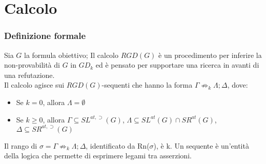 \documentclass[\main/tesi.tex]{subfiles}
\begin{document}
\section{Calcolo}

\subsubsection{Definizione formale}
Sia $G$ la formula obiettivo; Il calcolo $RGD(G)$ è un procedimento per inferire la non-provabilità di $G$ in $GD_k$ ed è pensato per supportare una ricerca in avanti di una refutazione.\\
Il calcolo agisce sui $RGD(G)$-sequenti che hanno la forma $\Gamma \not\Rightarrow_k \Lambda; \Delta$, dove:
\begin{itemize}
    \item Se $k = 0$, allora $\Lambda = \emptyset$
    \item Se $k \geq 0$, allora $\Gamma \subseteq SL^{at,\supset}(G)$, $\Lambda \subseteq SL^{at}(G) \cap SR^{at}(G)$, $\Delta \subseteq SR^{at,\supset}(G)$
\end{itemize}
Il rango di $\sigma = \Gamma \not\Rightarrow_k \Lambda; \Delta$, identificato da Rn($\sigma$), è k. Un sequente è un'entità della logica che permette di esprimere legami tra asserzioni.
\end{document}
